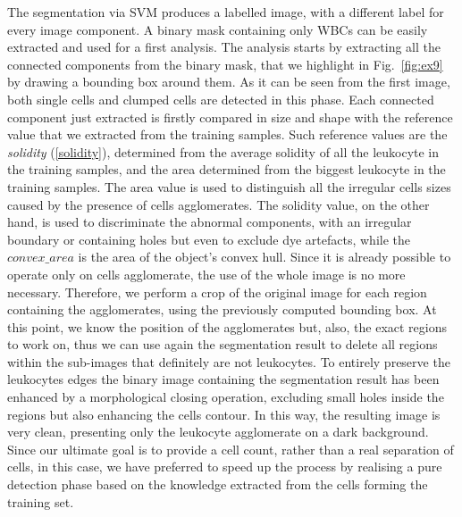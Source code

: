 \documentclass[final,a4paper,12pt,english]{UnicaPhdThesis3}
\begin{document}
The segmentation via SVM produces a labelled image, with a different label for every image component. A binary mask containing only WBCs can be easily extracted and used for a first analysis. The analysis starts by extracting all the connected components from the binary mask, that we highlight in Fig.~\ref{fig:ex9} by drawing a bounding box around them. As it can be seen from the first image, both single cells and clumped cells are detected in this phase.
Each connected component just extracted is firstly compared in size and shape with the reference value that we extracted from the training samples. Such reference values are the \textit{solidity} (\ref{solidity}), determined from the average solidity of all the leukocyte in the training samples, and the area determined from the biggest leukocyte in the training samples. The area value is used to distinguish all the irregular cells sizes caused by the presence of cells agglomerates. The solidity value, on the other hand, is used to discriminate the abnormal components, with an irregular boundary or containing holes but even to exclude dye artefacts, while the $convex\_area$ is the area of the object's convex hull. Since it is already possible to operate only on cells agglomerate, the use of the whole image is no more necessary. Therefore, we perform a crop of the original image for each region containing the agglomerates, using the previously computed bounding box. At this point, we know the position of the agglomerates but, also, the exact regions to work on, thus we can use again the segmentation result to delete all regions within the sub-images that definitely are not leukocytes. 
To entirely preserve the leukocytes edges the binary image containing the segmentation result has been enhanced by a morphological closing operation, excluding small holes inside the regions but also enhancing the cells contour. In this way, the resulting image is very clean, presenting only the leukocyte agglomerate on a dark background. Since our ultimate goal is to provide a cell count, rather than a real separation of cells, in this case, we have preferred to speed up the process by realising a pure detection phase based on the knowledge extracted from the cells forming the training set. 
\end{document}
